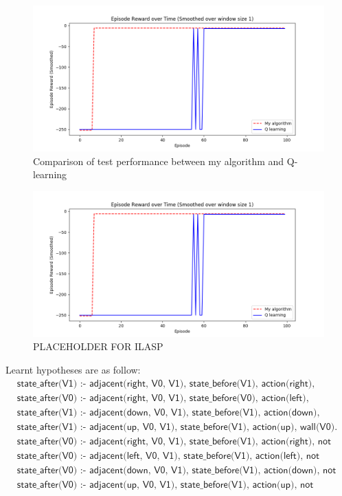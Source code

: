 \begin{figure}[!htb]
\centering
\includegraphics[width=1.0\textwidth]{./figures/experiment1_test}
\caption{Comparison of test performance between my algorithm and Q-learning}
\label{experiment1_test}
\end{figure}

\begin{figure}[!htb]
\centering
\includegraphics[width=1.0\textwidth]{./figures/experiment1_test}
\caption{PLACEHOLDER FOR ILASP}
\label{experiment1_test}
\end{figure}
    

Learnt hypotheses are as follow:
\begin{equation*}
\begin{split}
&\textsf{state\_after(V1) :- adjacent(right, V0, V1), state\_before(V1), action(right), wall(V0).}\\
&\textsf{state\_after(V0) :- adjacent(right, V0, V1), state\_before(V0), action(left), wall(V1).}\\
&\textsf{state\_after(V1) :- adjacent(down, V0, V1), state\_before(V1), action(down), wall(V0).}\\
&\textsf{state\_after(V1) :- adjacent(up, V0, V1), state\_before(V1), action(up), wall(V0).}\\
&\textsf{state\_after(V0) :- adjacent(right, V0, V1), state\_before(V1), action(right), not wall(V0).}\\
&\textsf{state\_after(V0) :- adjacent(left, V0, V1), state\_before(V1), action(left), not wall(V0).}\\
&\textsf{state\_after(V0) :- adjacent(down, V0, V1), state\_before(V1), action(down), not wall(V0).}\\
&\textsf{state\_after(V0) :- adjacent(up, V0, V1), state\_before(V1), action(up), not wall(V0).}
\end{split}
\end{equation*}

